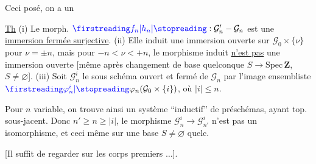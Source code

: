 Ceci posé, on a un

\uline{Th} (i) Le morph. $\unsure{f_n|h_n}:\mathcal G'_n-\mathcal G_n$ est une \uline{immersion fermée surjective}. (ii) Elle induit une immersion ouverte sur $\mathcal G_0\times\{\nu\}$ pour $\nu=\pm n$, mais pour $-n<\nu<+n$, le morphisme induit \uline{n'est pas} une immersion ouverte [même après changement de base quelconque $S\longrightarrow\mathrm{Spec}\,\mathbf Z$, $S\ne\varnothing$]. (iii) Soit $\mathcal G_n^i$ le sous schéma ouvert  et fermé de $\mathcal G_n$  par l'image ensembliste $\deleted{\unsure{\varphi_n^i}}\varphi_n(\mathcal G_0\times\{i\})$, où $|i|\leq n$.


Pour $n$ variable, on trouve ainsi un système ``inductif''  de préschémas, ayant   top. sous-jacent. Donc  $n'\geq n\geq|i|$, le morphisme $\mathcal G_n^i\longrightarrow\mathcal G_{n'}^i$ n'est pas un isomorphisme, et ceci même sur une base $S\ne\varnothing$ quelc.

[Il suffit de regarder sur les corps premiers $\ldots$].


